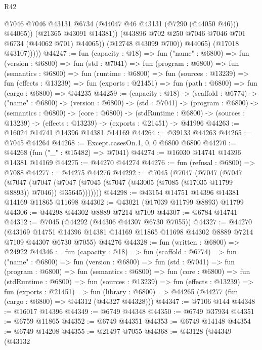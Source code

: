 \begin{lexlean}{R42}
\begin{coremodule}
{                        @7046
                        @7046
                        @43131
                        @6734
                        (@44047 @46 @43131 (@7290 (@44050 @46)))
                        @44065))
                    (@21365 @43091 @14381))
                  (@43896 @702 @250 @7046 @7046 @701 @6734 (@44062 @701) @44065))
                (@12748 @43099 @700))
              @44065)
            (@17018 @43107)))))
@44247 := fun (capacity : @18) =>
  fun ("name" : @6800) =>
  fun (version : @6800) =>
  fun (std : @7041) =>
  fun (program : @6800) =>
  fun (semantics : @6800) =>
  fun (runtime : @6800) =>
  fun (sources : @13239) =>
  fun (effects : @13239) =>
  fun (exports : @21451) => fun (path : @6800) => fun (cargo : @6800) => @44235
@44259 := (capacity : @18) ->
  (scaffold : @6774) ->
  ("name" : @6800) ->
  (version : @6800) ->
  (std : @7041) ->
  (program : @6800) ->
  (semantics : @6800) ->
  (core : @6800) ->
  (stdRuntime : @6800) -> (sources : @13239) -> (effects : @13239) -> (exports : @21451) -> @41996
@44263 := @16024 @14741 @14396 @14381 @14169
@44264 := @39133 @44263
@44265 := @7045 @44264
@44268 := Except.casesOn.{1, 0, 0} @6800 @6800
@44270 := @44268 (fun ("_" : @15482) => @7041)
@44274 := @16030 @14741 @14396 @14381 @14169
@44275 := @44270 @44274
@44276 := fun (refusal : @6800) => @7088
@44277 := @44275 @44276
@44292 := @7045
    (@7047
      (@7047
        (@7047
          (@7047
            (@7047 (@7047 (@7045 (@7047 (@43005 (@7085 (@17035 @11799 @8893)) @7046)) @35645)))))))
@44298 := @43154 @14751 @14396 @14381 @14169 @11865 @11698
@44302 := @43021 (@17039 @11799 @8893) @11799
@44306 := @44298 @44302 @8889 @7214 @7109
@44307 := @6784 @14741
@44312 := @7045 (@44292 (@44306 @44307 @6730 @7055))
@44327 := @44270
    (@43169 @14751 @14396 @14381 @14169 @11865 @11698 @44302 @8889 @7214 @7109 @44307 @6730 @7055)
    @44276
@44328 := fun (written : @6800) => @24922
@44346 := fun (capacity : @18) =>
  fun (scaffold : @6774) =>
  fun ("name" : @6800) =>
  fun (version : @6800) =>
  fun (std : @7041) =>
  fun (program : @6800) =>
  fun (semantics : @6800) =>
  fun (core : @6800) =>
  fun (stdRuntime : @6800) =>
  fun (sources : @13239) =>
  fun (effects : @13239) =>
  fun (exports : @21451) =>
  fun (library : @6800) => @44265 (@44277 (fun (cargo : @6800) => @44312 (@44327 @44328)))
@44347 := @7106 @144
@44348 := @16017 @14396
@44349 := @6749 @44348
@44350 := @6749 @37934
@44351 := @6759 @11865
@44352 := @6749 @44351
@44353 := @6749 @14148
@44354 := @6749 @14208
@44355 := @21497 @7055
@44368 := @43128
    (@44349
      (@43132
}
\end{coremodule}
\end{lexlean}
